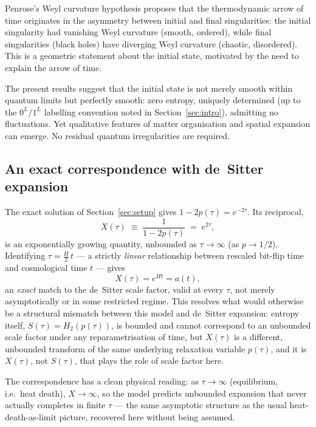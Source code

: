 \documentclass[11pt]{article}
\begin{document}
Penrose's Weyl curvature hypothesis \cite{penrose1979} proposes that the
thermodynamic arrow of time originates in the asymmetry between initial and
final singularities: the initial singularity had vanishing Weyl curvature
(smooth, ordered), while final singularities (black holes) have diverging
Weyl curvature (chaotic, disordered). This is a geometric statement about
the initial state, motivated by the need to explain the arrow of time.

The present results suggest that the initial state
is not merely smooth within quantum limits but perfectly smooth:
zero entropy, uniquely determined (up to the $0^L/1^L$ labelling convention noted in
Section~\ref{sec:intro}), admitting no fluctuations. Yet
qualitative features of matter organisation and spatial expansion can emerge.
No residual quantum irregularities are required.


\subsection{An exact correspondence with de~Sitter expansion}
\label{sec:desitter}

The exact solution of Section~\ref{sec:setup} gives $1-2p(\tau) = e^{-2\tau}$. Its reciprocal,
\[
X(\tau) \;\equiv\; \frac{1}{1-2p(\tau)} \;=\; e^{2\tau},
\]
is an exponentially growing quantity, unbounded as $\tau\to\infty$ (as $p\to1/2$). Identifying $\tau =
\tfrac{H}{2}\,t$ --- a strictly \emph{linear} relationship between rescaled bit-flip time and cosmological
time $t$ --- gives
\[
X(\tau) = e^{Ht} = a(t),
\]
an \emph{exact} match to the de~Sitter scale factor, valid at every $\tau$, not merely asymptotically or in
some restricted regime. This resolves what would otherwise be a structural mismatch between this model and
de~Sitter expansion: entropy itself, $S(\tau)=H_2(p(\tau))$, is bounded and cannot correspond to an unbounded
scale factor under any reparametrisation of time, but $X(\tau)$ is a different, unbounded transform of the
same underlying relaxation variable $p(\tau)$, and it is $X(\tau)$, not $S(\tau)$, that plays the role of
scale factor here.

The correspondence has a clean physical reading: as $\tau\to\infty$ (equilibrium, i.e.\ heat death), $X\to
\infty$, so the model predicts unbounded expansion that never actually completes in finite $\tau$ --- the
same asymptotic structure as the usual heat-death-as-limit picture, recovered here without being assumed.
\end{document}
